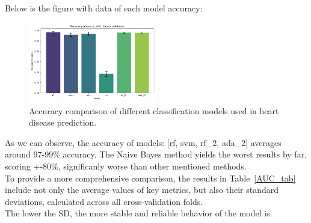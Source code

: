 \documentclass[conference]{IEEEtran}
\begin{document}
Below is the figure with data of each model accuracy:
\begin{figure}[H]%
    \centering
    \includegraphics[width=0.5\textwidth]{../src/plots/accuracy_cv_plot.png}
    \caption{Accuracy comparison of different classification models used in heart disease prediction.}
    \label{fig:accuracy}
\end{figure}

As we can observe, the accuracy of models: [rf, svm, rf\_2, ada\_2] averages around 97-99\% accuracy.
The Naive Bayes method yields the worst results by far, scoring +-80\%, significanly worse than other
mentioned methods.
\\ 

To provide a more comprehensive comparison, the results in Table~\ref{AUC_tab} include not only the average values of key metrics,  
but also their standard deviations, calculated across all cross-validation folds. \\
The lower the SD, the more stable and reliable behavior of the model is.
\end{document}
